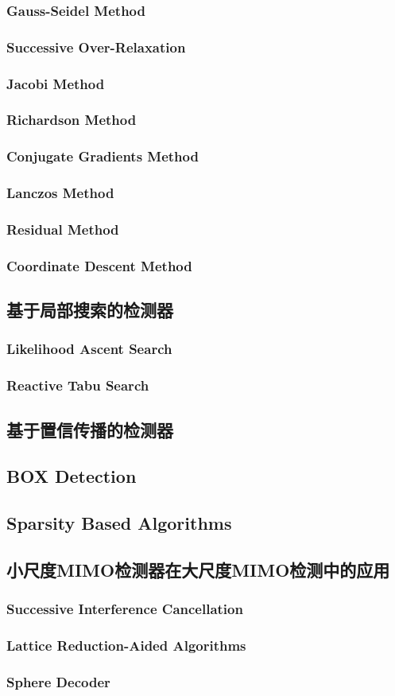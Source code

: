 \subsubsection{Gauss-Seidel Method}
\subsubsection{Successive Over-Relaxation}
\subsubsection{Jacobi Method}
\subsubsection{Richardson Method}
\subsubsection{Conjugate Gradients Method}
\subsubsection{Lanczos Method}
\subsubsection{Residual Method}
\subsubsection{Coordinate Descent Method}
\subsection{基于局部搜索的检测器}
\subsubsection{Likelihood Ascent Search}
\subsubsection{Reactive Tabu Search}
\subsection{基于置信传播的检测器}
\subsection{BOX Detection}
\subsection{Sparsity Based Algorithms}
\subsection{小尺度MIMO检测器在大尺度MIMO检测中的应用}
\subsubsection{Successive Interference Cancellation}
\subsubsection{Lattice Reduction-Aided Algorithms}
\subsubsection{Sphere Decoder}
